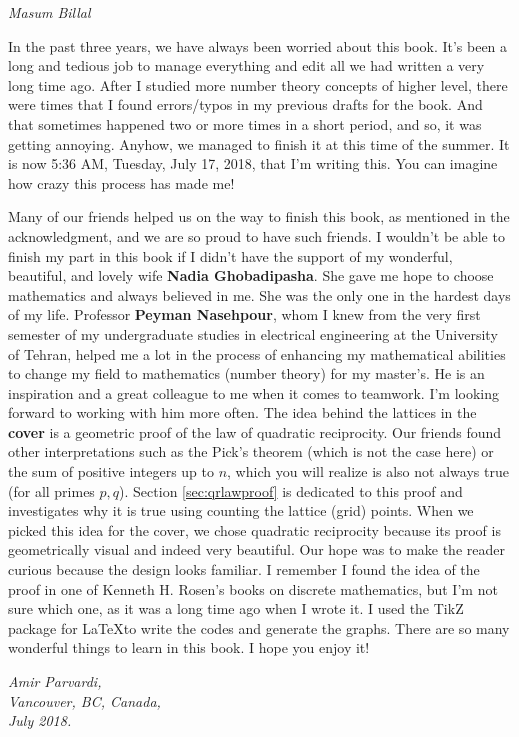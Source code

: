\documentclass[leqno,12pt]{book}
\begin{document}
\begin{flushright}
	\sl Masum Billal
\end{flushright}

\newpage

In the past three years, we have always been worried about this book. It's been a long and tedious job to manage everything and edit all we had written a very long time ago. After I studied more number theory concepts of higher level, there were times that I found errors/typos in my previous drafts for the book. And that sometimes happened two or more times in a short period, and so, it was getting annoying. Anyhow, we managed to finish it at this time of the summer. It is now 5:36 AM, Tuesday, July 17, 2018, that I'm writing this. You can imagine how crazy this process has made me!

\vspace{0.3cm}
Many of our friends helped us on the way to finish this book, as mentioned in the acknowledgment, and we are so proud to have such friends. I wouldn't be able to finish my part in this book if I didn't have the support of my wonderful, beautiful, and lovely wife \textbf{Nadia Ghobadipasha}. She gave me hope to choose mathematics and always believed in me. She was the only one in the hardest days of my life.
\vspace{0.3cm}
Professor \textbf{Peyman Nasehpour}, whom I knew from the very first semester of my undergraduate studies in electrical engineering at the University of Tehran, helped me a lot in the process of enhancing my mathematical abilities to change my field to mathematics (number theory) for my master's.  He is an inspiration and a great colleague to me when it comes to teamwork. I'm looking forward to working with him more often.
\vspace{0.3cm}
The idea behind the lattices in the \textbf{cover} is a geometric proof of the law of quadratic reciprocity. Our friends found other interpretations such as the Pick's theorem (which is not the case here) or the sum of positive integers up to $n$, which you will realize is also not always true (for all primes $p,q$). Section \eqref{sec:qrlawproof} is dedicated to this proof and investigates why it is true using counting the lattice (grid) points. When we picked this idea for the cover, we chose quadratic reciprocity because its proof is geometrically visual and indeed very beautiful. Our hope was to make the reader curious because the design looks familiar. I remember I found the idea of the proof in one of Kenneth H. Rosen's books on discrete mathematics, but I'm not sure which one, as it was a long time ago when I wrote it. I used the TikZ package for \LaTeX to write the codes and generate the graphs.
\vspace{0.3cm}
There are so many wonderful things to learn in this book. I hope you enjoy it!
\begin{flushright}
	\sl Amir Parvardi,\\
	Vancouver, BC, Canada,\\
	July 2018.
\end{flushright}
\end{document}
